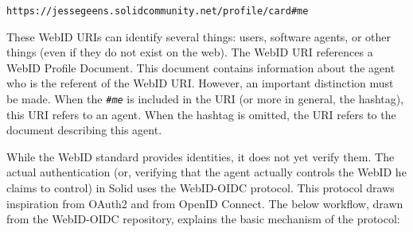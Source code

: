 \begin{center}
   \texttt{https://jessegeens.solidcommunity.net/profile/card\#me}\\
\end{center}

\noindent These WebID URIs can identify several things: users, software agents, or other things (even if they do not exist on the web). The WebID URI references a WebID Profile Document. This document contains information about the agent who is the referent of the WebID URI. However, an important distinction must be made. When the \textit{\texttt{\#me}} is included in the URI (or more in general, the hashtag), this URI refers to an agent. When the hashtag is omitted, the URI refers to the document describing this agent.

While the WebID standard provides identities, it does not yet verify them. The actual authentication (or, verifying that the agent actually controls the WebID he claims to control) in Solid uses the WebID-OIDC protocol. This protocol draws inspiration from OAuth2 and from OpenID Connect. The below workflow, drawn from the WebID-OIDC repository, explains the basic mechanism of the protocol:


